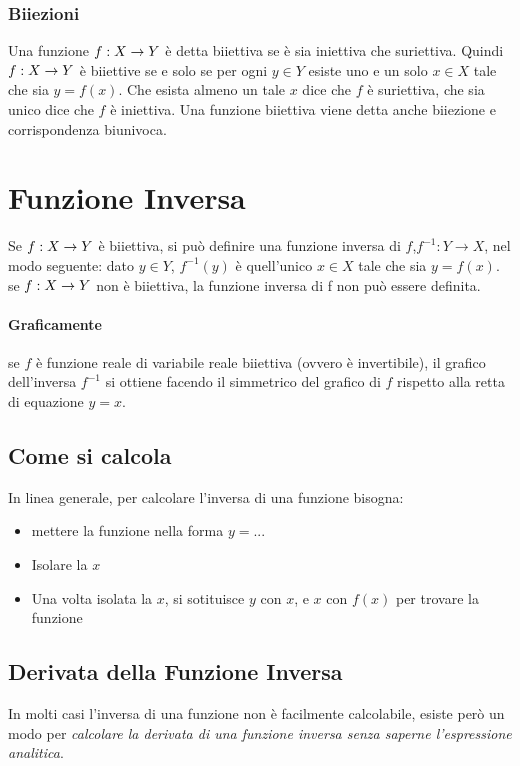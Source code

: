 \documentclass[12pt, a4paper, openany]{book}
\begin{document}
\subsubsection{Biiezioni}
Una funzione $f: X \rightarrow Y$ è detta biiettiva se è sia iniettiva che suriettiva.
Quindi $f: X \rightarrow Y$ è biiettive se e solo se per ogni $y \in Y$ esiste uno e un solo $x \in X$ tale che sia $y = f(x)$.
Che esista almeno un tale $x$ dice che $f$ è suriettiva, che sia unico dice che $f$ è iniettiva.
Una funzione biiettiva viene detta anche biiezione e corrispondenza biunivoca.

\section{Funzione Inversa}
Se $f: X \rightarrow Y$ è biiettiva, si può definire una funzione inversa di $f$,$f^{-1} : Y \rightarrow X$, nel modo seguente:
dato $y \in Y$, $f^{-1}(y)$ è quell'unico $x \in X$ tale che sia $y = f(x)$.
se $f: X \rightarrow Y$ non è biiettiva, la funzione inversa di f non può essere definita.
\paragraph*{Graficamente} se $f$ è funzione reale di variabile reale biiettiva (ovvero è invertibile),
 il grafico dell'inversa $f^{-1}$ si ottiene facendo il simmetrico del grafico di $f$ rispetto alla retta di equazione $y=x$.

\subsection*{Come si calcola}
In linea generale, per calcolare l'inversa di una funzione bisogna:
\begin{itemize}
	\item mettere la funzione nella forma $y=...$
 \item Isolare la $x$
 \item Una volta isolata la $x$, si sotituisce $y$ con $x$, e $x$ con $f(x)$ per trovare la funzione
\end{itemize}

\subsection*{Derivata della Funzione Inversa}
In molti casi l'inversa di una funzione non è facilmente calcolabile,
esiste però un modo per \emph{calcolare la derivata di una funzione inversa senza saperne l'espressione analitica}.
\end{document}
